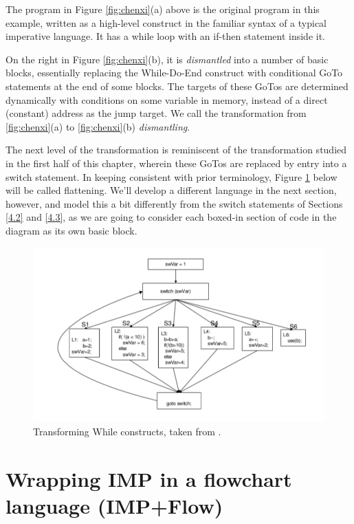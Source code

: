 \documentclass[12pt,notitlepage]{report}
\theoremstyle{plain}
\theoremstyle{definition}
\newcommand{\define}[1]{\emph{#1}\index{#1}}
\numberwithin{equation}{section}
\begin{document}
The program in Figure \ref{fig:chenxi}(a) above is the original program in this example, written as a high-level construct in the familiar syntax of a typical imperative language.  It has a while loop with an if-then statement inside it.  
\par On the right in Figure \ref{fig:chenxi}(b), it is \define{dismantled} into a number of basic blocks, essentially replacing the While-Do-End construct with conditional GoTo statements at the end of some blocks.  The targets of these GoTos are determined dynamically with conditions on some variable in memory, instead of a direct (constant) address as the jump target.  We call the transformation from \ref{fig:chenxi}(a) to \ref{fig:chenxi}(b) \define{dismantling}.
\par The next level of the transformation is reminiscent of the transformation studied in the first half of this chapter, wherein these GoTos are replaced by entry into a switch statement.  In keeping consistent with prior terminology, Figure \ref{fig:chenxi2} below will be called flattening.  We'll develop a different language in the next section, however, and model this a bit differently from the switch statements of Sections \ref{4.2} and \ref{4.3}, as we are going to consider each boxed-in section of code in the diagram as its own basic block.

\noindent\begin{figure}[H]
        \centering
        \includegraphics[scale=0.6]{WhileSmash2.png}
        \caption{Transforming While constructs, taken from \cite{Wang}.}
        \label{fig:chenxi2}
        \end{figure}

\section{Wrapping IMP in a flowchart language (IMP+Flow)}
\end{document}
